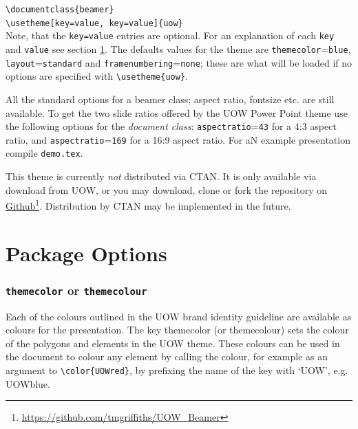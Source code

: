 \documentclass[a4paper,oneside,11pt]{article}
\newcommand{\key}[1]{\texttt{\color{UOWorange}#1}}
\newcommand{\val}[1]{\texttt{\color{UOWblue}#1}}
\newcommand{\command}[1]{\texttt{\color{UOWdarkgreen}#1}}
\begin{document}
\command{\textbackslash{}documentclass\{beamer\}}\\
\command{\textbackslash{}usetheme[\key{key}=\val{value}, \key{key}=\val{value}]\{uow\}}\\

Note, that the \command{\key{key}=\val{value}} entries are optional. For an explanation of each \key{key} and \val{value} see section \ref{sec:options}. The defaults values for the theme are \key{themecolor}=\val{blue}, \key{layout}=\val{standard} and \key{framenumbering}=\val{none}; these are what will be loaded if no options are specified with \command{\textbackslash{}usetheme\{uow\}}. 

All the standard options for a beamer class; aspect ratio, fontsize etc. are still available. To get the two slide ratios offered by the UOW Power Point theme use the following options for the \emph{document class}: \key{aspectratio}=\val{43} for a 4:3 aspect ratio, and \key{aspectratio}=\val{169} for a 16:9 aspect ratio. For aN example presentation compile \texttt{demo.tex}.

This theme is currently \emph{not} distributed via CTAN. It is only available via download from UOW, or you may download, clone or fork the repository on \href{https://github.com/tmgriffiths/UOW_Beamer}{Github}\footnote{\url{https://github.com/tmgriffiths/UOW_Beamer}}. Distribution by CTAN may be implemented in the future.

\section{Package Options}\label{sec:options}

\subsubsection*{\key{themecolor} or \key{themecolour}}
Each of the colours outlined in the UOW brand identity guideline are available as colours for the presentation. The key themecolor (or themecolour) sets the colour of the polygons and elements in the UOW theme. These colours can be used in the document to colour any element by calling the colour, for example as an argument to \command{\textbackslash{}color\{UOWred\}}, by prefixing the name of the key with `UOW', e.g. UOWblue.
\end{document}
